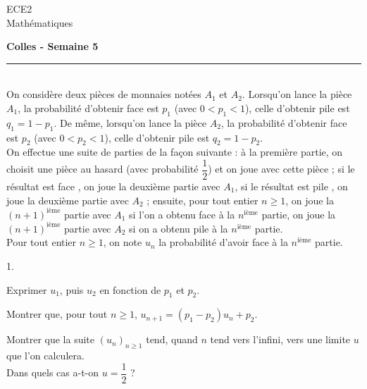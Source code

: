 \documentclass[11pt]{article}%
\begin{document}
\begin{flushleft}
ECE2 \\
Mathématiques
\end{flushleft}

\begin{center}
\textbf{\Large{Colles - Semaine 5}}
\end{center}

\hrule

\vspace*{0,2cm}



\begin{exercice}~\\
On considère deux pièces de monnaies notées $A_1$ et $A_2$. 
Lorsqu'on lance la pièce $A_1$, la probabilité d'obtenir \og face 
\fg{} est $p_1$ (avec $0<p_1<1$), celle d'obtenir \og pile \fg{} est 
$q_1=1-p_1$. De même, lorsqu'on lance la pièce $A_2$, la probabilité 
d'obtenir \og face \fg{} est $p_2$ (avec $0<p_2<1$), celle d'obtenir 
\og pile \fg{} est $q_2=1-p_2$.\\
On effectue une suite de parties de la façon suivante : à la 
première partie, on choisit une pièce au hasard (avec probabilité $ 
\dfrac{1}{2}$) et on joue avec cette pièce ; si le résultat est \og 
face \fg{}, on joue la deuxième partie avec $A_1$, si le résultat 
est \og pile \fg{}, on joue la deuxième partie avec $A_2$ ; ensuite, 
pour tout entier $n \geq 1$, on joue la $(n+1)^{\text{ième}}$ partie 
avec $A_1$ si l'on a obtenu \og face \fg{} à la $n^{\text{ième}}$ 
partie, on joue la $(n+1)^{\text{ième}}$ partie avec $A_2$ si on a 
obtenu \og pile \fg{} à la $n^{\text{ième}}$ partie.\\
Pour tout entier $n \geq 1$, on note $u_n$ la probabilité d'avoir 
\og face \fg{} à la $n^{\text{ième}}$ partie.
\begin{noliste}{1.}
  \item Exprimer $u_1$, puis $u_2$ en fonction de $p_1$ et $p_2$.
  
  \item Montrer que, pour tout $n \geq 1$, $u_{n+1} = (p_1 - p_2)u_n 
  + p_2$.
  
  \item Montrer que la suite $(u_n)_{n \geq 1}$ tend, quand $n$ tend 
  vers l'infini, vers une limite $u$ que l'on calculera.\\
  Dans quels cas a-t-on $ u=\dfrac{1}{2}$ ?
\end{noliste}
\end{exercice}
\end{document}
